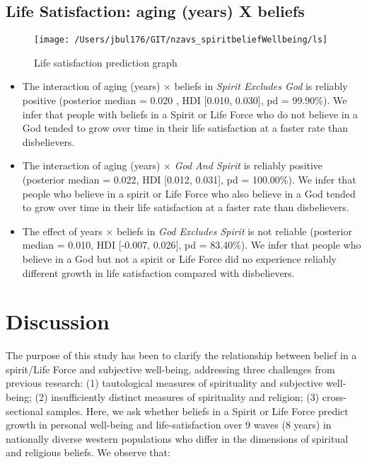 \documentclass[
  english,
  man,floatsintext]{apa6}
\providecommand{\tightlist}{%
  \setlength{\itemsep}{0pt}\setlength{\parskip}{0pt}}
\begin{document}
\hypertarget{life-satisfaction-aging-years-x-beliefs}{%
\subsection{Life Satisfaction: aging (years) X beliefs}\label{life-satisfaction-aging-years-x-beliefs}}

\begin{figure}
\texttt{[image: /Users/jbul176/GIT/nzavs\_spiritbeliefWellbeing/ls]} \caption{Life satisfaction prediction graph}\label{fig:unnamed-chunk-3}
\end{figure}

\begin{itemize}
\tightlist
\item
  The interaction of aging (years) \(\times\) beliefs in \emph{Spirit Excludes God} is reliably positive (posterior median = 0.020 , HDI {[}0.010, 0.030{]}, pd = 99.90\%). We infer that people with beliefs in a Spirit or Life Force who do not believe in a God tended to grow over time in their life satisfaction at a faster rate than disbelievers.
\item
  The interaction of aging (years) \(\times\) \emph{God And Spirit} is reliably positive (posterior median = 0.022, HDI {[}0.012, 0.031{]}, pd = 100.00\%). We infer that people who believe in a spirit or Life Force who also believe in a God tended to grow over time in their life satisfaction at a faster rate than disbelievers.
\item
  The effect of years \(\times\) beliefs in \emph{God Excludes Spirit} is not reliable (posterior median = 0.010, HDI {[}-0.007, 0.026{]}, pd = 83.40\%). We infer that people who believe in a God but not a spirit or Life Force did no experience reliably different growth in life satisfaction compared with disbelievers.
\end{itemize}

\hypertarget{discussion}{%
\section{Discussion}\label{discussion}}

The purpose of this study has been to clarify the relationship between belief in a spirit/Life Force and subjective well-being, addressing three challenges from previous research: (1) tautological measures of spirituality and subjective well-being; (2) insufficiently distinct measures of spirituality and religion; (3) cross-sectional samples. Here, we ask whether beliefs in a Spirit or Life Force predict growth in personal well-being and life-satisfaction over 9 waves (8 years) in nationally diverse western populations who differ in the dimensions of spiritual and religious beliefs. We observe that:
\end{document}
